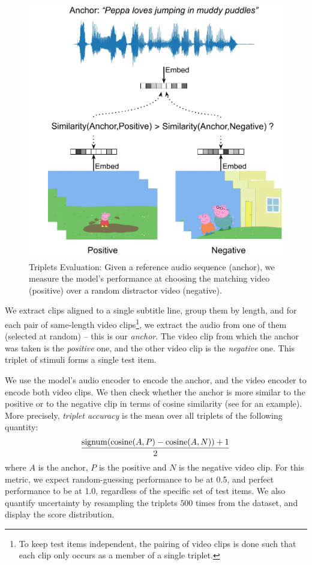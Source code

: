 \begin{figure}
	\centering
	\includegraphics[width=\columnwidth]{peppa_triplets_eval_detailed.pdf}
	\caption{Triplets Evaluation: Given a reference audio sequence (anchor), we 
	measure the model's performance at choosing the matching video (positive) 
	over a random distractor video (negative).}
	\label{fig:triplets_eval}
\end{figure}

We extract clips aligned to a single subtitle
line, group them by length, and for each pair of same-length video
clips\footnote{To keep test items independent, the pairing of video
  clips is done such that each clip only occurs as a member of a single
  triplet.}, we extract the audio from one of them (selected at
random) -- this is our {\it anchor}. The video clip from which the
anchor was taken is the {\it positive} one, and the other video clip
is the {\it negative} one. This triplet of stimuli forms a single test
item.

We use the model's audio encoder to encode the anchor, and the
video encoder to encode both video clips. We then check whether 
the anchor is more similar to the positive or to the negative clip in terms of cosine
similarity (see  for an example).  More precisely, {\it triplet 
accuracy} is the mean over all triplets of the following quantity:
\begin{equation}
\hspace{-.03cm}
  \frac{\mathrm{signum}(\mathrm{cosine}(A, P) - \mathrm{cosine}(A, N)) + 1}{2}
  \label{eq:triplet-acc}
\end{equation}
where $A$ is the anchor, $P$ is the positive and $N$ is the negative video 
clip. 
For this metric, we expect random-guessing performance to be at 0.5, and perfect
performance to be at 1.0, regardless of the specific set of test items. We also 
quantify uncertainty by resampling the triplets $500$ times from the dataset, 
and display the score distribution.


